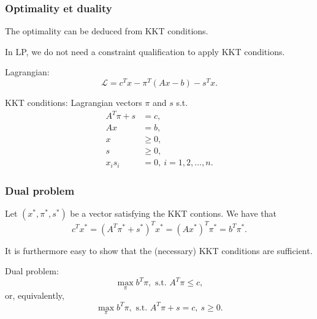 \documentclass{beamer}
\begin{document}
\begin{frame}
\frametitle{Optimality et duality}

The optimality can be deduced from KKT conditions.

\mbox{}

In LP, we do not need a constraint qualification to apply KKT conditions.

\mbox{}

Lagrangian:
\[
\mathcal{L} = c^Tx - \pi^T(Ax-b) - s^Tx.
\]

KKT conditions: Lagrangian vectors $\pi$ and $s$ s.t.
\begin{align*}
A^T\pi + s &= c,\\
Ax &= b,\\
x &\geq 0,\\
s &\geq 0,\\
x_is_i &= 0,\ i=1,2,\ldots,n.
\end{align*}

\end{frame}

\begin{frame}
\frametitle{Dual problem}

Let $(x^*, \pi^*, s^*)$ be a vector satisfying the KKT contions. We have that
\[
c^Tx^* = (A^T\pi^*+s^*)^Tx^* = (Ax^*)^T\pi^* = b^T\pi^*.
\]

It is furthermore easy to show that the (necessary) KKT conditions are sufficient.

\mbox{}

{\red Dual problem}:
\[
\max_\pi b^T\pi, \mbox{ s.t. } A^T\pi \leq c,
\]
or, equivalently,
\[
\max_\pi b^T\pi, \mbox{ s.t. } A^T\pi +s = c,\ s \geq 0.
\]

\end{frame}
\end{document}
